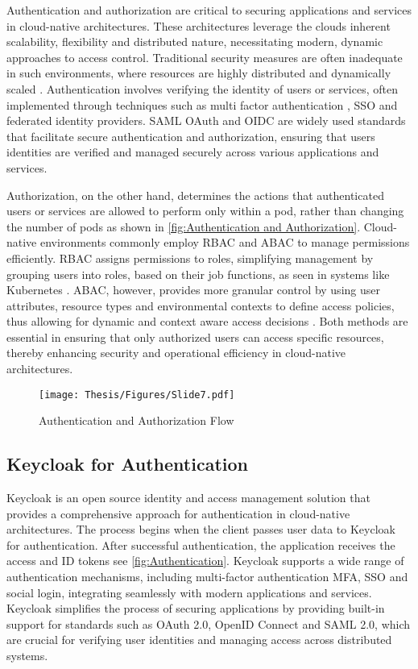 Authentication and authorization are critical to securing applications and services in cloud-native architectures. These architectures leverage the clouds inherent scalability, flexibility and distributed nature, necessitating modern, dynamic approaches to access control. Traditional security measures are often inadequate in such environments, where resources are highly distributed and dynamically scaled \cite{mohamed2024cloud}. Authentication involves verifying the identity of users or services, often implemented through techniques such as multi factor authentication , SSO and federated identity providers. SAML OAuth and OIDC are widely used standards that facilitate secure authentication and authorization, ensuring that users identities are verified and managed securely across various applications and services. \cite{r38, r39}

Authorization, on the other hand, determines the actions that authenticated users or services are allowed to perform only within a pod, rather than changing the number of pods as shown in \autoref{fig:Authentication and Authorization}. Cloud-native environments commonly employ RBAC and ABAC to manage permissions efficiently. RBAC assigns permissions to roles, simplifying management by grouping users into roles, based on their job functions, as seen in systems like Kubernetes \cite{r40}. ABAC, however, provides more granular control by using user attributes, resource types and environmental contexts to define access policies, thus allowing for dynamic and context aware access decisions \cite{r41}. Both methods are essential in ensuring that only authorized users can access specific resources, thereby enhancing security and operational efficiency in cloud-native architectures.

\captionsetup{justification=centering}
\begin{figure}[h]
\centering
\texttt{[image: Thesis/Figures/Slide7.pdf]}
\caption{\label{fig:Authentication and Authorization}Authentication and Authorization Flow \cite{r42}}
\end{figure}

\subsection{Keycloak for Authentication}

Keycloak is an open source identity and access management  solution that provides a comprehensive approach for authentication in cloud-native architectures. The process begins when the client passes user data to Keycloak for authentication. After successful authentication, the application receives the access and ID tokens see \autoref{fig:Authentication}. Keycloak supports a wide range of authentication mechanisms, including multi-factor authentication MFA, SSO and social login, integrating seamlessly with modern applications and services. Keycloak simplifies the process of securing applications by providing built-in support for standards such as OAuth 2.0, OpenID Connect and SAML 2.0, which are crucial for verifying user identities and managing access across distributed systems. \cite{r38}

